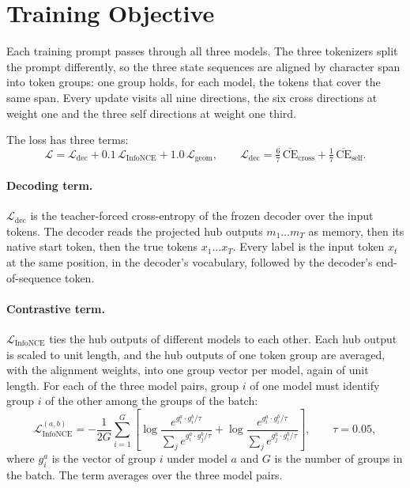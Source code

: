 \section{Training Objective}\label{sec:hub:training}

Each training prompt passes through all three models. The three tokenizers split the prompt differently, so the three state sequences are aligned by character span into token groups: one group holds, for each model, the tokens that cover the same span. Every update visits all nine directions, the six cross directions at weight one and the three self directions at weight one third.

The loss has three terms:
\begin{equation}
\mathcal{L} = \mathcal{L}_{\text{dec}} + 0.1\,\mathcal{L}_{\text{InfoNCE}} + 1.0\,\mathcal{L}_{\text{geom}},
\qquad
\mathcal{L}_{\text{dec}} = \tfrac{6}{7}\,\overline{\text{CE}}_{\text{cross}} + \tfrac{1}{7}\,\overline{\text{CE}}_{\text{self}} .
\label{eq:hub:loss}
\end{equation}

\paragraph{Decoding term.} $\mathcal{L}_{\text{dec}}$ is the teacher-forced cross-entropy of the frozen decoder over the input tokens. The decoder reads the projected hub outputs $m_1 \ldots m_T$ as memory, then its native start token, then the true tokens $x_1 \ldots x_T$. Every label is the input token $x_t$ at the same position, in the decoder's vocabulary, followed by the decoder's end-of-sequence token.

\paragraph{Contrastive term.} $\mathcal{L}_{\text{InfoNCE}}$ ties the hub outputs of different models to each other. Each hub output is scaled to unit length, and the hub outputs of one token group are averaged, with the alignment weights, into one group vector per model, again of unit length. For each of the three model pairs, group $i$ of one model must identify group $i$ of the other among the groups of the batch:
\begin{equation}
\mathcal{L}_{\text{InfoNCE}}^{(a,b)} = -\frac{1}{2G}\sum_{i=1}^{G}\left[\log\frac{e^{g^a_i\cdot g^b_i/\tau}}{\sum_j e^{g^a_i\cdot g^b_j/\tau}} + \log\frac{e^{g^a_i\cdot g^b_i/\tau}}{\sum_j e^{g^a_j\cdot g^b_i/\tau}}\right],
\qquad \tau = 0.05 ,
\label{eq:hub:infonce}
\end{equation}
where $g^a_i$ is the vector of group $i$ under model $a$ and $G$ is the number of groups in the batch. The term averages over the three model pairs.

